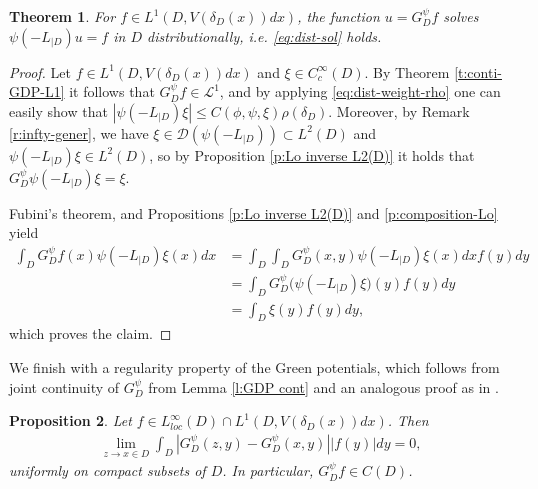 \documentclass[12pt,a4paper,onecolumn]{article}
\newtheorem{thm}{Theorem}[section]
\newtheorem{prop}[thm]{Proposition}
\theoremstyle{definition}
\newcommand{\1}{\mathbf 1}
\newcommand{\de}{\delta_D}
\newcommand{\LLL}{L^1(D,V(\de(x))dx)}
\newcommand{\DD}{\mathcal{D}}
\newcommand{\calL}{\mathcal{L}^1}
\newcommand{\Lo}{\psi(-L_{|D})}
\newcommand{\GDP}{G_D^\psi}
\numberwithin{equation}{section}
\begin{document}
	\begin{thm}\label{t:GDPf dist-sol}
		For $f\in \LLL$, the function $u=\GDP f$ solves $\Lo u=f$ in $D$
		distributionally, i.e. \eqref{eq:dist-sol} holds.
	\end{thm}
	\begin{proof}
		Let $f\in \LLL$ and  $\xi\in C_c^\infty(D)$. By Theorem \ref{t:conti-GDP-L1} it follows that $\GDP f\in \calL$, and by applying \eqref{eq:dist-weight-rho} one can easily show that $|\Lo \xi|\le C(\phi,\psi,\xi) \rho(\de)$.  Moreover, by Remark \ref{r:infty-gener}, we have $\xi \in \DD(\Lo)\subset L^2(D)$ and $\Lo \xi \in L^2(D)$, so by Proposition \ref{p:Lo inverse L2(D)} it holds that $\GDP\Lo \xi=\xi$.
		
		Fubini's theorem, and Propositions \ref{p:Lo inverse L2(D)}
		and \ref{p:composition-Lo} yield
		\begin{align*}
			\int_D \GDP f(x)\Lo \xi(x)dx&=\int_D \int_D \GDP(x,y)\Lo \xi (x)
			dxf(y)dy\\
            & =\int_D G_D^\psi \big(\Lo \xi\big)(y)f(y)dy\\
			&=\int_D  \xi(y)f(y)dy,
		\end{align*}
		which proves the claim.
	\end{proof}
	We finish with a regularity property of the Green potentials, which follows from joint continuity of $\GDP$ from Lemma \ref{l:GDP cont} and an analogous proof as in \cite[Proposition 2.16 \& Remark 2.17]{Bio23cpaa}.
        \begin{prop}\label{p:uniform}
            Let $f\in L_{loc}^\infty(D)\cap \LLL$. Then 
            \begin{align*}
                \lim_{z\to x\in D}\int_D|\GDP(z,y)-\GDP(x,y)||f(y)|dy=0,
            \end{align*}
            uniformly on compact subsets of $D$. In particular, $\GDP f \in C(D)$.
        \end{prop}
	
\end{document}
